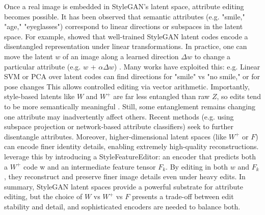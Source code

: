 Once a real image is embedded in StyleGAN's latent space, attribute editing becomes possible. It has been observed that semantic attributes (e.g. "smile," "age," "eyeglasses") correspond to linear directions or subspaces in the latent space.
For example, \cite{shen2020interpretinglatentspacegans} showed that well-trained StyleGAN latent codes encode a disentangled representation under linear transformations.
In practice, one can move the latent $w$ of an image along a learned direction $\Delta w$ to change a particular attribute (e.g. $w$ + $\alpha\Delta w$) \cite{AGE}.
Many works have exploited this: e.g. Linear SVM or PCA over latent codes can find directions for "smile" vs "no smile," or for pose changes
This allows controlled editing via vector arithmetic. Importantly, style-based latents like $W$ and $W^+$ are far less entangled than raw $Z$, so edits tend to be more semantically meaningful \cite{karras2020analyzingimprovingimagequality,shen2020interpretinglatentspacegans}.
Still, some entanglement remains changing one attribute may inadvertently affect others. Recent methods (e.g. using subspace projection or network-based attribute classifiers) seek to further disentangle attributes. Moreover, higher-dimensional latent spaces (like $W^+$ or $F$) 
can encode finer identity details, enabling extremely high-quality reconstructions. \cite{bobkov2024devildetailsstylefeatureeditordetailrich} leverage this by introducing a StyleFeatureEditor: an encoder that predicts both a $W^+$ code w and an intermediate feature tensor $F_k$.
By editing in both $w$ and $F_k$, they reconstruct and preserve finer image details even under heavy edits. 
In summary, StyleGAN latent spaces provide a powerful substrate for attribute editing, 
but the choice of $W$ vs $W^+$ vs $F$ presents a trade-off between edit stability and detail, and sophisticated encoders are needed to balance both.

